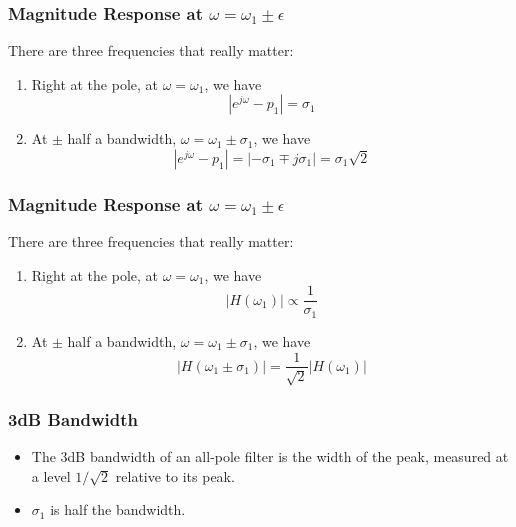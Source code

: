 \documentclass{beamer}
\begin{document}
\begin{frame}
  \frametitle{Magnitude Response at $\omega=\omega_1\pm\epsilon$}

  There are three frequencies that really matter:
  \begin{enumerate}
  \item Right at the pole, at $\omega=\omega_1$, we have
    \begin{displaymath}
      |e^{j\omega}-p_1|= \sigma_1
    \end{displaymath}
  \item At $\pm$ half a bandwidth, $\omega=\omega_1\pm\sigma_1$, we have
    \begin{displaymath}
      |e^{j\omega}-p_1|= |-\sigma_1\mp j\sigma_1| = \sigma_1\sqrt{2}
    \end{displaymath}
  \end{enumerate}
\end{frame}  


\begin{frame}
  \frametitle{Magnitude Response at $\omega=\omega_1\pm\epsilon$}

  There are three frequencies that really matter:
  \begin{enumerate}
  \item Right at the pole, at $\omega=\omega_1$, we have
    \begin{displaymath}
      |H(\omega_1)| \propto \frac{1}{\sigma_1}
    \end{displaymath}
  \item At $\pm$ half a bandwidth, $\omega=\omega_1\pm\sigma_1$, we have
    \begin{displaymath}
      |H(\omega_1\pm\sigma_1)| = \frac{1}{\sqrt{2}}|H(\omega_1)|
    \end{displaymath}
  \end{enumerate}
\end{frame}  

\begin{frame}
  \frametitle{3dB Bandwidth}

  \begin{itemize}
  \item The 3dB bandwidth of an all-pole filter is the width of the peak,
    measured at a level $1/\sqrt{2}$ relative to its peak.
  \item $\sigma_1$ is half the bandwidth.
  \end{itemize}
\end{frame}  

\end{document}
